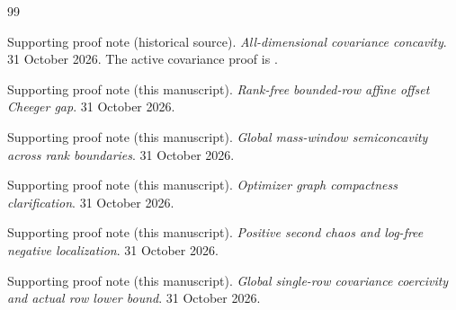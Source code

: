 \begingroup
\raggedright
\begin{thebibliography}{99}



Supporting proof note (historical source). \emph{All-dimensional covariance concavity}. 31 October 2026. The active covariance proof is \cite{hodge}.

\par{}




Supporting proof note (this manuscript). \emph{Rank-free bounded-row affine offset Cheeger gap}. 31 October 2026.

\par{}




Supporting proof note (this manuscript). \emph{Global mass-window semiconcavity across rank boundaries}. 31 October 2026.

\par{}




Supporting proof note (this manuscript). \emph{Optimizer graph compactness clarification}. 31 October 2026.

\par{}




Supporting proof note (this manuscript). \emph{Positive second chaos and log-free negative localization}. 31 October 2026.

\par{}




Supporting proof note (this manuscript). \emph{Global single-row covariance coercivity and actual row lower bound}. 31 October 2026.


\end{thebibliography}

